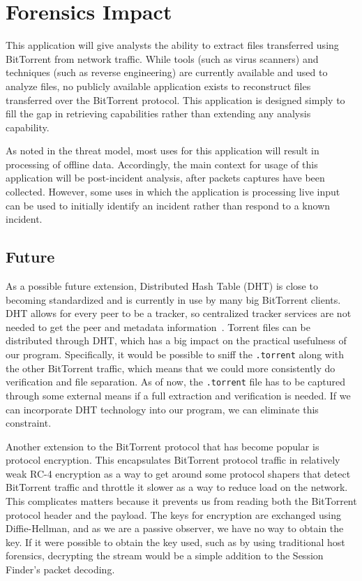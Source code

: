 \documentclass{acm_proc_article-sp}
\begin{document}
\section{Forensics Impact}
This application will give analysts the ability to extract files transferred
using BitTorrent from network traffic. While tools (such as virus scanners) and
techniques (such as reverse engineering) are currently available and used to
analyze files, no publicly available application exists to reconstruct files
transferred over the BitTorrent protocol. This application is designed simply to
fill the gap in retrieving capabilities rather than extending any analysis
capability.

As noted in the threat model, most uses for this application will result in
processing of offline data. Accordingly, the main context for usage of this
application will be post-incident analysis, after packets captures have been
collected. However, some uses in which the application is processing live input
can be used to initially identify an incident rather than respond to a known
incident.

\subsection{Future}
As a possible future extension, Distributed Hash Table (DHT) is close to
becoming standardized and is currently in use by many big BitTorrent clients.
DHT allows for every peer to be a tracker, so centralized tracker services are
not needed to get the peer and metadata information~\cite{dhtext}. Torrent files
can be distributed through DHT, which has a big impact on the practical
usefulness of our program.  Specifically, it would be possible to sniff the
\texttt{.torrent} along with the other BitTorrent traffic, which means that we
could more consistently do verification and file separation. As of now, the
\texttt{.torrent} file has to be captured through some external means if a full
extraction and verification is needed.  If we can incorporate DHT technology
into our program, we can eliminate this constraint.

Another extension to the BitTorrent protocol that has become popular is protocol
encryption.  This encapsulates BitTorrent protocol traffic in relatively weak
RC-4 encryption as a way to get around some protocol shapers that detect
BitTorrent traffic and throttle it slower as a way to reduce load on the
network. This complicates matters because it prevents us from reading both the
BitTorrent protocol header and the payload. The keys for encryption are
exchanged using Diffie-Hellman, and as we are a passive observer, we have no way
to obtain the key.  If it were possible to obtain the key used, such as by using
traditional host forensics, decrypting the stream would be a simple addition to
the Session Finder's packet decoding.
\end{document}
